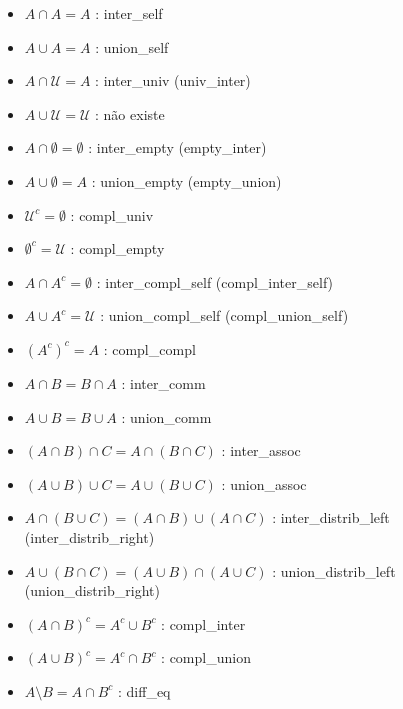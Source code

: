 \begin{itemize}
\item $A \cap A = A$ : {\selectfont inter\_self}
\item $A \cup A = A$ : {\selectfont union\_self}
\item $A \cap \mathcal U = A$ : {\selectfont inter\_univ} ({\selectfont univ\_inter})
\item $A \cup \mathcal U = \mathcal U$ : não existe
\item $A \cap \emptyset = \emptyset$ : {\selectfont inter\_empty} ({\selectfont empty\_inter})
\item $A \cup \emptyset = A$ : {\selectfont union\_empty} ({\selectfont empty\_union})
\item $\mathcal U ^c = \emptyset$ : {\selectfont compl\_univ}
\item $\emptyset ^c = \mathcal U$ : {\selectfont compl\_empty}
\item $A \cap A^c = \emptyset$ : {\selectfont inter\_compl\_self} ({\selectfont compl\_inter\_self})
\item $A \cup A^c = \mathcal U$ : {\selectfont union\_compl\_self} ({\selectfont compl\_union\_self})
\item $(A^c)^c = A$ : {\selectfont compl\_compl}
\item $A \cap B = B \cap A$ : {\selectfont inter\_comm}
\item $A \cup B = B \cup A$ : {\selectfont union\_comm}
\item $(A \cap B) \cap C = A \cap (B \cap C)$ : {\selectfont inter\_assoc}
\item $(A \cup B) \cup C = A \cup (B \cup C)$ : {\selectfont union\_assoc}
\item $A \cap (B \cup C) = (A \cap B) \cup (A \cap C)$ : {\selectfont inter\_distrib\_left} ({\selectfont inter\_distrib\_right})
\item $A \cup (B \cap C) = (A \cup B) \cap (A \cup C)$ : {\selectfont union\_distrib\_left} ({\selectfont union\_distrib\_right})
\item $(A \cap B)^c = A^c \cup B^c$ : {\selectfont compl\_inter}
\item $(A \cup B)^c = A^c \cap B^c$ : {\selectfont compl\_union}
\item $A \setminus B = A \cap B^c$ : {\selectfont diff\_eq}
\end{itemize}

